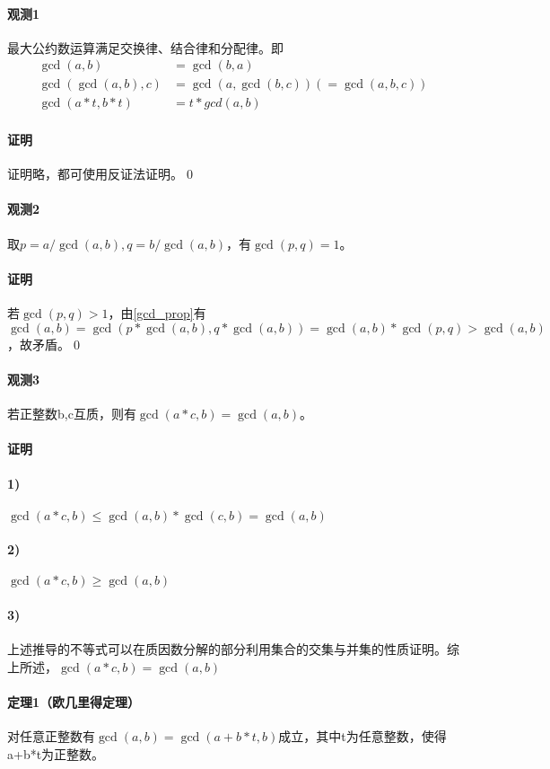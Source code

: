 \documentclass[UTF8]{ctexart}
\begin{document}
    \paragraph{观测1} 最大公约数运算满足交换律、结合律和分配律。即
    \begin{equation}\label{gcd_prop}
        \begin{aligned}
            \gcd(a,b)&=\gcd(b,a)\\
            \gcd(\gcd(a,b),c)&=\gcd(a,\gcd(b,c)) (=\gcd(a,b,c))\\
            \gcd(a*t,b*t)&=t*gcd(a,b)
        \end{aligned}
    \end{equation}
    \paragraph{证明} 证明略，都可使用反证法证明。\qed
    \paragraph{观测2} 取$p=a/\gcd(a,b), q=b/\gcd(a,b)$，有$\gcd(p,q)=1$。
    \paragraph{证明} 若$\gcd(p,q)>1$，由\ref{gcd_prop}有$\gcd(a,b)=\gcd(p*\gcd(a,b),q*\gcd(a,b))=\gcd(a,b)*\gcd(p,q)>\gcd(a,b)$，故矛盾。\qed
    \paragraph{观测3} 若正整数b,c互质，则有$\gcd(a*c,b)=\gcd(a,b)$。
    \paragraph{证明}
    \paragraph{1)} $\gcd(a*c,b)\leq\gcd(a,b)*\gcd(c,b)=\gcd(a,b)$
    \paragraph{2)} $\gcd(a*c,b)\geq\gcd(a,b)$
    \paragraph{3)} 上述推导的不等式可以在质因数分解的部分利用集合的交集与并集的性质证明。综上所述，$\gcd(a*c,b)=\gcd(a,b)$
    \paragraph{定理1（欧几里得定理）} 对任意正整数有$\gcd(a,b)=\gcd(a+b*t,b)$成立，其中t为任意整数，使得a+b*t为正整数。
\end{document}
